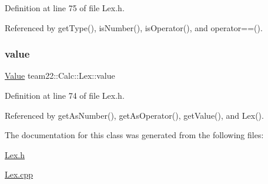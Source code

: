 Definition at line 75 of file Lex.\+h.



Referenced by get\+Type(), is\+Number(), is\+Operator(), and operator==().

\mbox{\label{classteam22_1_1_calc_1_1_lex_a8a78a736b719931cada0905ac13fedc8}} 
\subsubsection{\texorpdfstring{value}{value}}
{\footnotesize\ttfamily \hyperlink{unionteam22_1_1_calc_1_1_lex_1_1_value}{Value} team22\+::\+Calc\+::\+Lex\+::value\hspace{0.3cm}{\ttfamily [protected]}}



Definition at line 74 of file Lex.\+h.



Referenced by get\+As\+Number(), get\+As\+Operator(), get\+Value(), and Lex().



The documentation for this class was generated from the following files\+:\begin{DoxyCompactItemize}
\item 
\hyperlink{_lex_8h}{Lex.\+h}\item 
\hyperlink{_lex_8cpp}{Lex.\+cpp}\end{DoxyCompactItemize}
